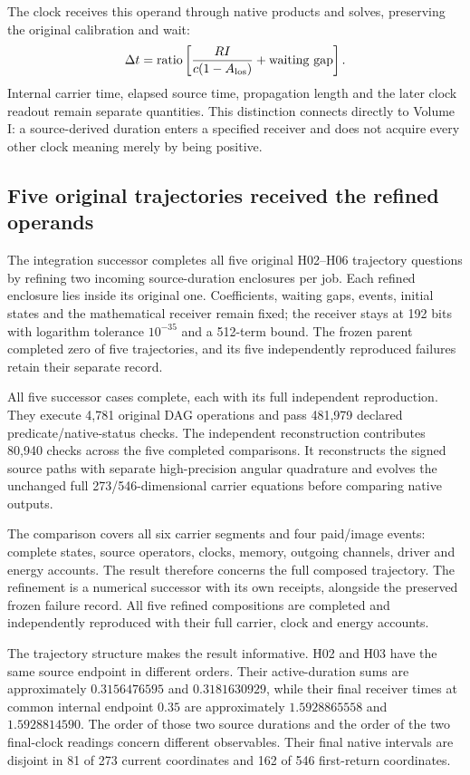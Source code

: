 The clock receives this operand through native products and solves, preserving the original calibration and wait:
\begin{equation}
 \Delta t=\mathrm{ratio}\left[
 \frac{RI}{c(1-A_{\rm los})}+\mathrm{waiting\ gap}\right].
\end{equation}
Internal carrier time, elapsed source time, propagation length and the later clock readout remain separate quantities. This distinction connects directly to Volume I: a source-derived duration enters a specified receiver and does not acquire every other clock meaning merely by being positive.

\subsection{Five original trajectories received the refined operands}

The integration successor completes all five original H02--H06 trajectory questions by refining two incoming source-duration enclosures per job. Each refined enclosure lies inside its original one. Coefficients, waiting gaps, events, initial states and the mathematical receiver remain fixed; the receiver stays at 192 bits with logarithm tolerance $10^{-35}$ and a 512-term bound. The frozen parent completed zero of five trajectories, and its five independently reproduced failures retain their separate record.

All five successor cases complete, each with its full independent reproduction. They execute 4,781 original DAG operations and pass 481,979 declared predicate/native-status checks. The independent reconstruction contributes 80,940 checks across the five completed comparisons. It reconstructs the signed source paths with separate high-precision angular quadrature and evolves the unchanged full 273/546-dimensional carrier equations before comparing native outputs.

The comparison covers all six carrier segments and four paid/image events: complete states, source operators, clocks, memory, outgoing channels, driver and energy accounts. The result therefore concerns the full composed trajectory. The refinement is a numerical successor with its own receipts, alongside the preserved frozen failure record. All five refined compositions are completed and independently reproduced with their full carrier, clock and energy accounts.

The trajectory structure makes the result informative. H02 and H03 have the same source endpoint in different orders. Their active-duration sums are approximately $0.3156476595$ and $0.3181630929$, while their final receiver times at common internal endpoint $0.35$ are approximately $1.5928865558$ and $1.5928814590$. The order of those two source durations and the order of the two final-clock readings concern different observables. Their final native intervals are disjoint in 81 of 273 current coordinates and 162 of 546 first-return coordinates.

